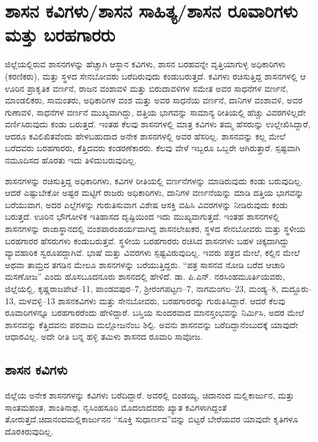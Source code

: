 
\chapter{ಶಾಸನ ಕವಿಗಳು/ಶಾಸನ ಸಾಹಿತ್ಯ/ಶಾಸನ ರೂವಾರಿಗಳು ಮತ್ತು ಬರಹಗಾರರು}

ಜಿಲ್ಲೆಯಲ್ಲಿರುವ ಶಾಸನಗಳನ್ನು ಹೆಚ್ಚಾಗಿ ಆಸ್ಥಾನ ಕವಿಗಳು, ಶಾಸನ ಬರಹವನ್ನೇ ವೃತ್ತಿಯಾಗುಳ್ಳ ಅಧಿಕಾರಿಗಳು (ಕರಣಿಕರು), ಮತ್ತು ಸ್ಥಳದ ಸೇನಬೋವರು ಬರೆದಿರುವುದು ಕಂಡುಬರುತ್ತದೆ. ಕವಿಗಳು ರಚಿಸುತ್ತಿದ್ದ ಶಾಸನಗಳಲ್ಲಿ ಆ ಊರಿನ ಪ್ರಾಕೃತಿಕ ವರ್ಣನೆ, ರಾಜನ ವಂಶಾವಳಿ ಮತ್ತು ಬಿರುದಾವಳಿಗಳ ಸಮೇತ ಅವರ ಸಾಧನೆಗಳ ವರ್ಣನೆ, ಮಾಂಡಲಿಕರು, ಸಾಮಂತರು, ಅಧಿಕಾರಿಗಳ ವಂಶ ಮತ್ತು ಅವರ ಸಾಧನೆಯ ವರ್ಣನೆ, ದಾನಿಗಳ ವಂಶಾವಳಿ, ಅವರ ಗುಣಾವಳಿ, ಸಾಧನೆಗಳ ವರ್ಣನೆ ಮುಖ್ಯವಾಗಿದ್ದು, ದತ್ತಿಯ ಭಾಗವನ್ನು ಸಾಮಾನ್ಯ ರೀತಿಯಲ್ಲಿ ಹೆಚ್ಚು ವಿವರಗಳಿಲ್ಲದೇ ವರ್ಣಿಸಿರುವುದು ಕಂಡು ಬರುತ್ತದೆ. ಇಂತಹ ಕೆಲವು ಶಾಸನಗಳಲ್ಲಿ ಮಾತ್ರ ಕವಿಗಳು ತಮ್ಮ ಹೆಸರುನ್ನು ಉಲ್ಲೇಖಿಸಿದ್ದಾರೆ, ಆದರೂ ಕವಿಲಿಖಿತವೆಂದು ಹೇಳಬಹುದಾದ ಅನೇಕ ಶಾಸನಗಳಲ್ಲಿ ಅವರ ಹೆಸರಿಲ್ಲ. ಶಾಸನವನ್ನು ಕಲ್ಲ ಮೇಲೆ ಬರೆದವರು ಬರಹಗಾರರು, ಕೆತ್ತಿದವರು ಕಂಡರಣೆಕಾರರು. ಕೆಲವು ವೇಳೆ ಇಬ್ಬರೂ ಒಬ್ಬರೇ ಆಗಿರುತ್ತಾರೆ. ಸ್ಪಷ್ಟವಾಗಿ ನಮೂದಿಸದ ಹೊರತು ಇದು ತಿಳಿದುಬರುವುದಿಲ್ಲ.

ಶಾಸನಗಳನ್ನು ರಚಿಸುತ್ತಿದ್ದ ಅಧಿಕಾರಿಗಳು, ಕವಿಗಳ ರೀತಿಯಲ್ಲಿ ವರ್ಣನೆಗಳನ್ನು ಮಾಡಿರುವುದು ಕಂಡು ಬರುವುದಿಲ್ಲ. ಆದರೆ ಎಷ್ಟುಬೇಕೋ ಅಷ್ಟರ ಮಟ್ಟಿಗೆ ರಾಜರು ಅಧಿಕಾರಿಗಳು, ದಾನಿಗಳ ವರ್ಣನೆಯನ್ನು ಮಾಡಿ ದತ್ತಿಯ ಭಾಗವನ್ನು ಬರೆಯುವಾಗ, ಅದರ ಎಲ್ಲೆಗಳನ್ನು ಗುರುತಿಸುವಾಗ ವಿಶೇಷ ಆಸಕ್ತಿ ವಹಿಸಿ ವಿವರಗಳನ್ನು ನೀಡಿರುವುದು ಕಂಡು ಬರುತ್ತದೆ. ಊರಿನ ಭೌಗೋಳಿಕ ಇತಿಹಾಸದ ದೃಷ್ಟಿಯಿಂದ ಇದು ಮುಖ್ಯವಾಗುತ್ತದೆ. ಇಂತಹ ಶಾಸನಗಳಲ್ಲಿ ಶಾಸನಗಳನ್ನು ರಾಜಾಸ್ಥಾನದಲ್ಲಿ ವಂಶಪಾರಂಪರ್ಯವಾಗಿದ್ದ ಶಾಸನಲೇಖಕರ, ಸ್ಥಳದ ಸೇನಬೋವರು ಮತ್ತು ಸ್ಥಳೀಯ ಬರಹಗಾರರ ಹೆಸರುಗಳು ಕಂಡು\-ಬರುತ್ತವೆ. ಸ್ಥಳೀಯ ಬರಹಗಾರರು ರಚಿಸಿದ ಶಾಸನಗಳು ಬಹಳ ಚಿಕ್ಕದಾಗಿದ್ದು ವ್ಯಾವಹಾರಿಕ ಸ್ವರೂಪದ್ದಾಗಿವೆ. ಭಾಷೆ ಮತ್ತು ವಿವರಗಳು ಸ್ಪಷ್ಟವಿರುವುದಿಲ್ಲ. ಇವರು ಪತ್ರದ ಮೇಲೆ, ಕಲ್ಲಿನ ಮೇಲೆ ಅಥವಾ ತಾಮ್ರದ ತಗಡಿನ ಮೇಲೂ ಶಾಸನಗಳನ್ನು ಬರೆಯುತ್ತಿದ್ದರು. “ಪತ್ರ ಸಾಸನವ ನೋಡಿ ಬರೆದ ಆಚಾರಿ ಮಸಣೋಜ” ಎಂದು ಹೊಸಬೂದನೂರು ಶಾಸನದಲ್ಲಿ ಹೇಳಿದೆ. ಡಾ. ಪಿ.ಎನ್​. ನರಸಿಂಹಮೂರ್ತಿಯವರು, ಜಿಲ್ಲೆಯಲ್ಲಿ, ಕೃಷ್ಣರಾಜಪೇಟೆ–11, ಪಾಂಡವಪುರ–7, ಶ‍್ರೀರಂಗಪಟ್ಟಣ–7, ನಾಗಮಂಗಲ–23, ಮಂಡ್ಯ–8, ಮದ್ದೂರು–13, ಮಳವಳ್ಳಿ–13 ಶಾಸನಕವಿಗಳು ಮತ್ತು ಸೇನಬೋವರು, ಬರಹಗಾರರನ್ನು ಗುರುತಿಸಿದ್ದಾರೆ. ಆದರೆ ಕೆಲವು ರೂವಾರಿಗಳನ್ನೂ ಬರಹಗಾರರೆಂದು ಹೇಳಿದ್ದಾರೆ. ಬಸ್ತಿಯ ಸುಂದರವಾದ ಮಾನಸ್ತಂಭವನ್ನು ನಿರ್ಮಿಸಿ, ಅದರ ಮೇಲೆ ಶಾಸನವನ್ನು ಕೆತ್ತಿದವನು ಪರವಾದಿ ಮಲ್ಲೋಜನೆಂಬ ಶಿಲ್ಪಿ. ಅವನು ಶಾಸನವನ್ನು ಬರೆದಿದ್ದಾನೆಂಬುದಕ್ಕೆ ಯಾವುದೇ ಆಧಾರವಿಲ್ಲ. ಅದೇ ರೀತಿ ಬನ್ನ ಹಳ್ಳಿ ತಮಿಳು ಶಾಸನದ ರೂವಾರಿ ಸಾವೋಜ.

\section{ಶಾಸನ ಕವಿಗಳು}

ಜಿಲ್ಲೆಯ ಅನೇಕ ಶಾಸನಗಳನ್ನು ಕವಿಗಳು ಬರೆದಿದ್ದಾರೆ. ಅವರಲ್ಲಿ ಬಿಂಡಯ್ಯ, ಚಿದಾನಂದ ಮಲ್ಲಿಕಾರ್ಜುನ, ಮತ್ತು ಸಾಂತಮಹಂತ, ಶಾಂತಿನಾಥ, ನೃಸಿಂಹಸೂರಿ ಮೊದಲಾದವರು ಖ್ಯಾತ ಕವಿಗಳಾಗಿದ್ದಂತೆ ತೋರುತ್ತದೆ.\break ಚಿದಾನಂದಮಲ್ಲಿಕಾರ್ಜುನನ “ಸೂಕ್ತಿ ಸುಧಾರ್ಣವ”ವನ್ನು ಬಿಟ್ಟರೆ ಬೇರೆಯವರ ಯಾವುದೇ ಕೃತಿಗಳೂ ದೊರಕಿರುವುದಿಲ್ಲ.


